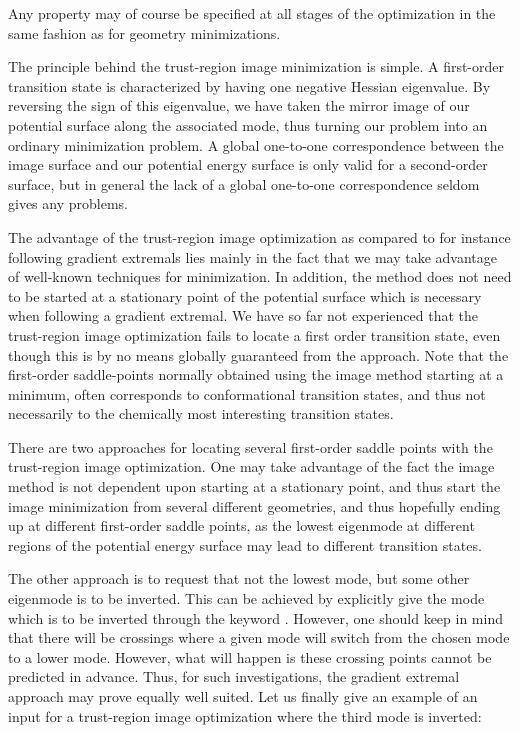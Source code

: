 Any property may of course be specified at all stages of the
optimization in the same fashion as for geometry minimizations.

The principle behind the trust-region image minimization is simple. A
first-order transition state is characterized by having one negative
Hessian eigenvalue. By reversing the sign of this
eigenvalue, we have 
taken the mirror image of our potential surface along the associated
mode, thus turning our problem into an ordinary
minimization problem. A global one-to-one correspondence between the
image surface and our potential energy surface is only valid for a
second-order surface, but in general the lack of a global one-to-one
correspondence seldom gives any problems.

The advantage of the trust-region image optimization as compared to
for instance following gradient extremals
lies mainly in the 
fact that we may take advantage of well-known techniques for
minimization. In addition, the method does not need to be started at
a stationary point of the potential surface which is necessary when
following a gradient extremal. We
have so far not experienced that the trust-region image optimization
fails to locate a first order transition state, even though this is by
no means globally guaranteed from the approach. Note that the
first-order saddle-points normally obtained using the image method
starting at a minimum, often corresponds to conformational transition
states, and thus not necessarily to the chemically most interesting
transition states.

There are two approaches for locating several first-order saddle
points with the trust-region image optimization. One may take
advantage of the fact the image method is not dependent upon starting
at a stationary point, and thus start the image minimization from
several different geometries, and thus hopefully ending up at different
first-order saddle points, as the lowest eigenmode
at different 
regions of the potential energy surface may lead to different
transition states.

The other approach is to request
that not the lowest mode, but some other eigenmode is to be inverted.
This can be achieved by explicitly give the mode which is to be
inverted through the keyword . However, one 
should keep in mind that there will be crossings where a given mode
will switch from the chosen mode to a lower mode. However, what will happen
is these crossing points cannot be predicted in advance. Thus, for such
investigations, the gradient extremal approach may prove equally well 
suited. Let us finally give an example of an input for a trust-region
image optimization where the third mode is inverted:

